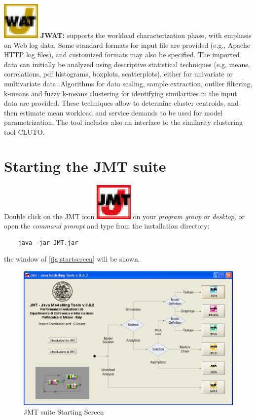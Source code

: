 \medskip \noindent \includegraphics[scale=.5]{img/JWATIcon}
\textbf{JWAT:} supports the workload characterization phase, with
emphasis on Web log data. Some standard formats for input file are
provided (e.g., Apache HTTP log files), and customized formats may
also be specified. The imported data can initially be analyzed using
descriptive statistical techniques (e.g, means, correlations, pdf
histograms, boxplots, scatterplots), either for univariate or
multivariate data. Algorithms for data scaling, sample extraction,
outlier filtering, k-means and fuzzy k-means clustering for
identifying similarities in the input data are provided. These
techniques allow to determine cluster centroids, and then estimate
mean workload and service demands to be used for model
parametrization. The tool includes also an interface to the
similarity clustering tool CLUTO.

\section{Starting the JMT suite}
Double click on the JMT icon
\includegraphics[scale=.5]{img/JMTIcon} on your \emph{program group} or
\emph{desktop}, or open the \emph{command prompt} and type from the
installation directory:
\begin{verbatim}
    java -jar JMT.jar
\end{verbatim}
the window of \autoref{fig:startscreen} will be shown.

\begin{figure}[htbp]
    \begin{center}
        \includegraphics[scale=.5]{img/StartScreen}
    \end{center}
    \caption{JMT suite Starting Screen}
    \label{fig:startscreen}
\end{figure}

